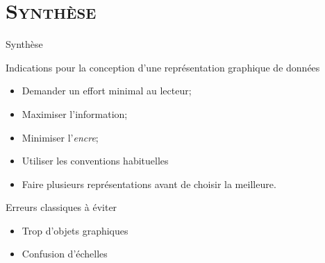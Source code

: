 \documentclass[xcolor=x11names,compress,8pt,fleqn]{beamer}
\renewcommand{\(}{\begin{columns}}
\renewcommand{\)}{\end{columns}}
\newcommand{\<}[1]{\begin{column}{#1}}
\renewcommand{\>}{\end{column}}
\begin{document}
\section[{\scshape Synthèse}]{{\scshape Synthèse }}
\begin{frame}{Synthèse}
\begin{alertblock}{Indications pour la conception d'une représentation graphique de données}
\begin{itemize}
\item Demander un effort minimal au lecteur;
\item Maximiser l'information;
\item Minimiser  l'\textit{encre};
\item Utiliser les conventions habituelles
\item Faire plusieurs représentations avant de choisir la meilleure.
\end{itemize}
\end{alertblock}
\begin{exampleblock}{Erreurs classiques à éviter}
\begin{itemize}
\item Trop d'objets graphiques
\item Confusion d'échelles

\end{itemize}
\end{exampleblock}
\end{frame}
\end{document}
